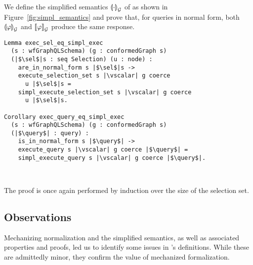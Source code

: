 We define the simplified semantics $\llparenthesis \cdot \rrparenthesis^{}_{\mathcal{G}}$ of \HP as shown in
Figure~\ref{fig:simpl_semantics} and prove that, for queries in normal
form, both $\llparenthesis \varphi \rrparenthesis^{}_{\mathcal{G}}$ and $\llbracket \varphi \rrbracket^{}_{\mathcal{G}}$ produce the same response. 
%
\begin{verbatim}
Lemma exec_sel_eq_simpl_exec
  (s : wfGraphQLSchema) (g : conformedGraph s) 
  (|$\sel$|s : seq Selection) (u : node) :
    are_in_normal_form s |$\sel$|s -> 
    execute_selection_set s |\vscalar| g coerce
      u |$\sel$|s = 
    simpl_execute_selection_set s |\vscalar| g coerce
      u |$\sel$|s.   

Corollary exec_query_eq_simpl_exec 
  (s : wfGraphQLSchema) (g : conformedGraph s)
  (|$\query$| : query) : 
    is_in_normal_form s |$\query$| -> 
    execute_query s |\vscalar| g coerce |$\query$| =
    simpl_execute_query s |\vscalar| g coerce |$\query$|.
    
 
\end{verbatim}

\noindent The proof is once again performed by induction over the size of the selection set.

 
\subsection{Observations}\label{subsec:norm_lims}

Mechanizing normalization and the simplified semantics, as well as associated properties and proofs, led us to identify some issues in \HP's definitions. While these are admittedly minor, they confirm the value of mechanized formalization.

